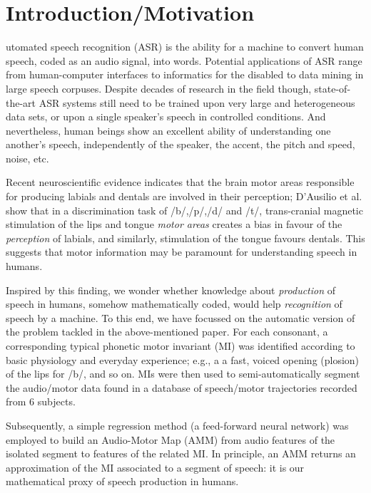 \section{Introduction/Motivation}
\label{sec:intro}

utomated speech recognition (ASR) is the ability for a machine
to convert human speech, coded as an audio signal, into words.
Potential applications of ASR range from human-computer interfaces
to informatics for the disabled to data mining in large speech corpuses.
Despite decades of research in the field though, state-of-the-art ASR
systems still need to be trained upon very large and heterogeneous data sets, or upon
a single speaker's speech in controlled conditions.
And nevertheless, human beings show an excellent ability
of understanding one another's speech, independently of the speaker, the
accent, the pitch and speed, noise, etc.

Recent neuroscientific
evidence indicates that the brain motor areas responsible for producing labials
and dentals are involved in their perception; D'Ausilio et al. \cite{dausilio}
show that in a discrimination task of /b/,/p/,/d/ and /t/, trans-cranial magnetic
stimulation of the lips and tongue \emph{motor areas} creates a bias in favour
of the \emph{perception} of labials, and similarly, stimulation of the tongue
favours dentals. This suggests that motor information may be paramount for
understanding speech in humans.

Inspired by this finding, we wonder whether knowledge about \emph{production}
of speech in humans, somehow mathematically coded, would help \emph{recognition}
of speech by a machine. To this end, we have focussed on the automatic version of
the problem tackled in the above-mentioned paper. For each consonant,
a corresponding typical phonetic motor invariant (MI) was
identified according to basic physiology and everyday experience;
e.g., a a fast, voiced opening (plosion) of the lips for /b/, and so on.
MIs were then used to semi-automatically segment the audio/motor data found in a
database of speech/motor trajectories recorded from $6$ subjects.

Subsequently, a simple regression method (a feed-forward neural network) was employed
to build an Audio-Motor Map (AMM) from audio features of the isolated segment to
features of the related MI. In principle, an AMM returns an approximation of the MI
associated to a segment of speech: it is our mathematical proxy of speech production
in humans.

